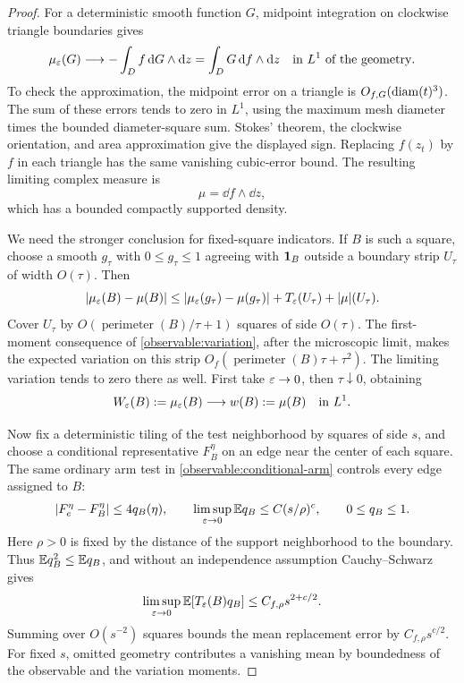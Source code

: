 \begin{proof}
For a deterministic smooth function $G$, midpoint integration on
clockwise triangle boundaries gives
\[
 \mu_\varepsilon(G)
 \longrightarrow -\int_D f\,\mathrm d G\wedge\mathrm d z
              =\int_DG\,\mathrm d f\wedge\mathrm d z
                 \quad\text{in }L^1\text{ of the geometry}.
\]
To check the approximation, the midpoint error on a triangle is
$O_{f,G}(\operatorname{diam}(t)^3)$. The sum of these errors tends to zero in $L^1$,
using the maximum mesh diameter times the bounded diameter-square sum.
Stokes' theorem, the clockwise orientation, and area approximation give
the displayed sign. Replacing $f(z_t)$ by $f$ in each triangle has the
same vanishing cubic-error bound. The resulting limiting complex measure
is
\[
                     \mu=\dd f\wedge\dd z,
\]
which has a bounded compactly supported density.

We need the stronger conclusion for fixed-square indicators. If $B$ is
such a square, choose a smooth $g_\tau$ with $0\le g_\tau\le1$ agreeing
with $\mathbf 1_B$ outside a boundary strip $U_\tau$ of width $O(\tau)$. Then
\[
 |\mu_\varepsilon(B)-\mu(B)|
 \le |\mu_\varepsilon(g_\tau)-\mu(g_\tau)|
                   +T_\varepsilon(U_\tau)+|\mu|(U_\tau).
\]
Cover $U_\tau$ by $O(\operatorname{perimeter}(B)/\tau+1)$ squares of
side $O(\tau)$. The first-moment consequence of
\eqref{observable:variation}, after the microscopic limit, makes the
expected variation on this strip $O_f(\operatorname{perimeter}(B)\tau+
\tau^2)$. The limiting variation tends to zero there as well. First take
$\varepsilon\to0$, then $\tau\downarrow0$, obtaining
\begin{equation}
                W_\varepsilon(B):=\mu_\varepsilon(B)\longrightarrow
                w(B):=\mu(B)\quad\text{in }L^1.
 \label{observable:square-l1}
\end{equation}

Now fix a deterministic tiling of the test neighborhood by squares of
side $s$, and choose a conditional representative $F_B^\eta$ on an edge
near the center of each square. The same ordinary arm test in
\eqref{observable:conditional-arm} controls every edge assigned to $B$:
\[
 |F_e^\eta-F_B^\eta|\le4q_B(\eta),\qquad
 \limsup_{\varepsilon\to0}\mathbb E q_B\le C(s/\rho)^c,
 \qquad 0\le q_B\le1.
\]
Here $\rho>0$ is fixed by the distance of the support neighborhood to the
boundary. Thus $\mathbb E q_B^2\le\mathbb E q_B$, and without an independence
assumption Cauchy--Schwarz gives
\[
 \limsup_{\varepsilon\to0}\mathbb E[T_\varepsilon(B)q_B]
      \le C_{f,\rho}s^{2+c/2}.
\]
Summing over $O(s^{-2})$ squares bounds the mean replacement error by
$C_{f,\rho}s^{c/2}$. For fixed $s$, omitted geometry contributes a
vanishing mean by boundedness of the observable and the variation
moments.


\end{proof}
